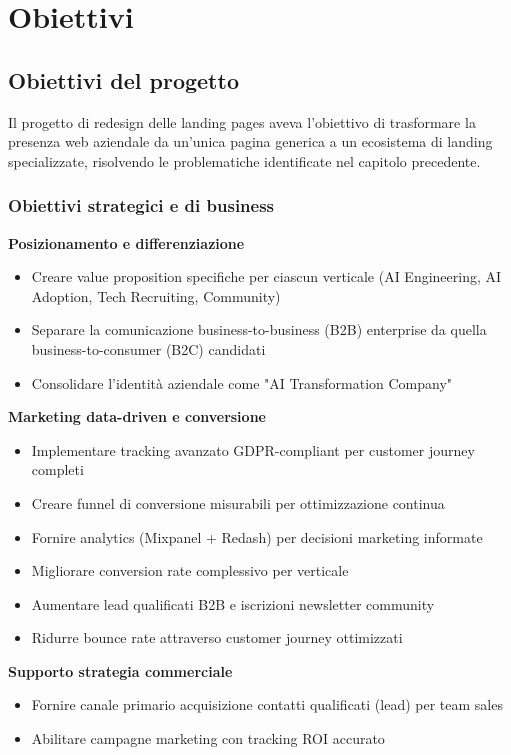 \chapter{Obiettivi}

\section{Obiettivi del progetto}
Il progetto di redesign delle landing pages aveva l'obiettivo di trasformare la presenza web aziendale da un'unica pagina generica a un ecosistema di landing specializzate, risolvendo le problematiche identificate nel capitolo precedente.

\subsection{Obiettivi strategici e di business}

\textbf{Posizionamento e differenziazione}
\begin{itemize}
  \item Creare value proposition specifiche per ciascun verticale (AI Engineering, AI Adoption, Tech Recruiting, Community)
  \item Separare la comunicazione business-to-business (B2B) enterprise da quella business-to-consumer (B2C) candidati
  \item Consolidare l'identità aziendale come "AI Transformation Company"
\end{itemize} 

\textbf{Marketing data-driven e conversione}
\begin{itemize}
  \item Implementare tracking avanzato GDPR-compliant per customer journey completi
  \item Creare funnel di conversione misurabili per ottimizzazione continua
  \item Fornire analytics (Mixpanel + Redash) per decisioni marketing informate
  \item Migliorare conversion rate complessivo per verticale
  \item Aumentare lead qualificati B2B e iscrizioni newsletter community
  \item Ridurre bounce rate attraverso customer journey ottimizzati
\end{itemize}

\textbf{Supporto strategia commerciale}
\begin{itemize}
  \item Fornire canale primario acquisizione contatti qualificati (lead) per team sales
  \item Abilitare campagne marketing con tracking ROI accurato
\end{itemize}

